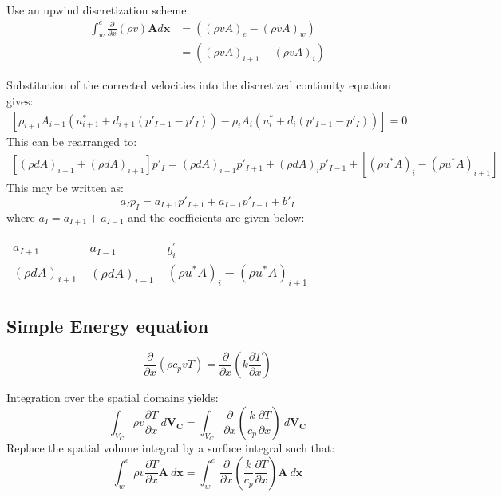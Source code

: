 Use an upwind discretization scheme
\begin{align}
	\int_{w}^{e}  \frac{\partial }{\partial x} (\rho v) \boldsymbol{A} d\boldsymbol{x}  &= 	  ((\rho v A)_e-(\rho v A)_w)  \nonumber \\
	&= 	  ((\rho v A)_{i+1}-(\rho v A)_i)
\end{align}

Substitution of the corrected velocities into the discretized continuity equation gives:
\begin{align}
	\left[\rho_{i+1}A_{i+1} (u^*_{i+1} + d_{i+1}(p'_{I-1}  - p'_I ))- \rho_{i}A_{i} (u^*_{i} + d_{i}(p'_{I-1}  - p'_I ))\right] = 0
\end{align}
\newpage 
This can be rearranged to:
\begin{align}
	\left[(\rho d A)_{i+1}+ (\rho d A)_{i+1}\right]p'_I =(\rho d A)_{i+1}p'_{I+1} + (\rho d A)_{i}p'_{I-1} + \left[(\rho u^*A)_i - (\rho u^*A)_{i+1}\right]
\end{align}
This may be written as:
\begin{equation}
	a_Ip_I = a_{I+1}p'_{I+1} + a_{I-1}p'_{I-1}+ b'_I
\end{equation}
where $a_I = a_{I+1} + a_{I-1} $ and the coefficients are given below:

\begin{table}[H]
	\begin{tabular}{|l|l|l|}
		\hline
		$a_{I+1}$			& $a_{I-1}$ 			& $b^'_i$      \\ \hline
		$(\rho d A)_{i+1}$  & $(\rho d A)_{i-1}$  	& $(\rho u^*A)_i - (\rho u^*A)_{i+1}$        \\ \hline  
	\end{tabular}
\end{table}

\subsection{Simple Energy equation }
\begin{equation}
	\frac{\partial}{\partial x}(\rho c_p v T) =\frac{ \partial}{\partial x}\left(k\frac{\partial T}{\partial x}\right)
\end{equation}

Integration over the spatial domains yields:
\begin{equation}
\int_{V_C} \rho v\frac{\partial T}{\partial x} \ d\boldsymbol{V_C}= \int_{V_C}\frac{\partial}{\partial x}\left(\frac{k}{c_p}\frac{\partial T}{\partial x}\right)  \ d\boldsymbol{V_C}
\end{equation}
Replace the spatial volume integral by a surface integral such that:
\begin{equation}
\int_{w}^{e}\rho v\frac{\partial T}{\partial x} \boldsymbol{A} \ d\boldsymbol{x} = \int_{w}^{e} \frac{\partial}{\partial x}\left(\frac{k}{c_p}\frac{\partial T}{\partial x}\right) \boldsymbol{A} \ d\boldsymbol{x} 
\end{equation}

